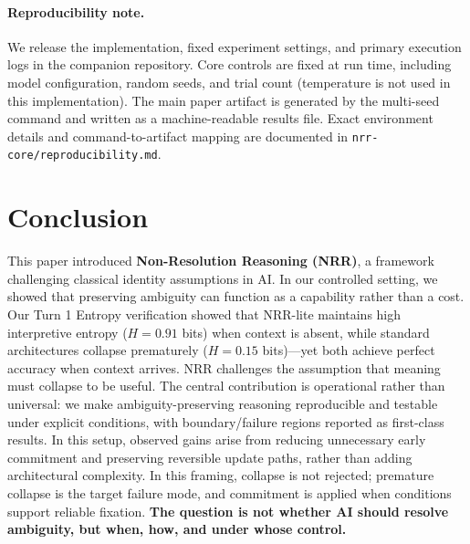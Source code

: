 \documentclass[11pt,a4paper]{article}
\begin{document}
\paragraph{Reproducibility note.}
We release the implementation, fixed experiment settings, and primary execution logs in the companion repository.
Core controls are fixed at run time, including model configuration, random seeds, and trial count (temperature is not used in this implementation).
The main paper artifact is generated by the multi-seed command and written as a machine-readable results file.
Exact environment details and command-to-artifact mapping are documented in \texttt{nrr-core/reproducibility.md}.

\section{Conclusion}

This paper introduced \textbf{Non-Resolution Reasoning (NRR)}, a framework challenging classical identity assumptions in AI.
In our controlled setting, we showed that preserving ambiguity can function as a capability rather than a cost.
Our Turn 1 Entropy verification showed that NRR-lite maintains high interpretive entropy ($H = 0.91$ bits) when context is absent, while standard architectures collapse prematurely ($H = 0.15$ bits)---yet both achieve perfect accuracy when context arrives.
NRR challenges the assumption that meaning must collapse to be useful.
The central contribution is operational rather than universal: we make ambiguity-preserving reasoning reproducible and testable under explicit conditions, with boundary/failure regions reported as first-class results.
In this setup, observed gains arise from reducing unnecessary early commitment and preserving reversible update paths, rather than adding architectural complexity.
In this framing, collapse is not rejected; premature collapse is the target failure mode, and commitment is applied when conditions support reliable fixation.
\textbf{The question is not whether AI should resolve ambiguity, but when, how, and under whose control.}
\end{document}

